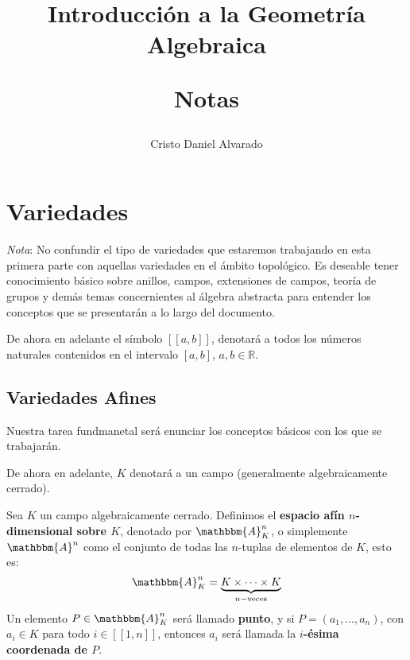 \documentclass[12pt]{report}
\newcounter{it}
\theoremstyle{largebreak}
\newcommand\natint[1]{\ensuremath{\left[\!\left[ #1\right]\!\right]}}
\newcommand{\bbm}[1]{\ensuremath{\mathbbm{#1}}}
\begin{document}
    \setlength{\parskip}{5pt} %
    \setlength{\parindent}{12pt} %
    \title{Introducción a la Geometría Algebraica
    
    Notas}
    \author{Cristo Daniel Alvarado}
    \maketitle

    \tableofcontents %

    
    \chapter{Variedades}
    
    \textit{Nota}: No confundir el tipo de variedades que estaremos trabajando en esta primera parte con aquellas variedades en el ámbito topológico. Es deseable tener conocimiento básico sobre anillos, campos, extensiones de campos, teoría de grupos y demás temas concernientes al álgebra abstracta para entender los conceptos que se presentarán a lo largo del documento.
    
    De ahora en adelante el símbolo $\natint{a,b}$, denotará a todos los números naturales contenidos en el intervalo $[a,b]$, $a,b\in\mathbb{R}$.

    \section{Variedades Afines}
    
    Nuestra tarea fundmanetal será enunciar los conceptos básicos con los que se trabajarán.

    De ahora en adelante, $K$ denotará a un campo (generalmente algebraicamente cerrado).

    \begin{mydef}
        Sea $K$ un campo algebraicamente cerrado. Definimos el \textbf{espacio afín $n$-dimensional sobre $K$}, denotado por $\bbm{A}_K^n$, o simplemente $\bbm{A}^n$ como el conjunto de todas las $n$-tuplas de elementos de $K$, esto es:
        \begin{equation*}
            \bbm{A}_K^n=\underset{n-\textup{veces}}{\underbrace{K\times\cdots\times K}}
        \end{equation*}
        Un elemento $P\in\bbm{A}_K^n$ será llamado \textbf{punto}, y si $P=(a_1,...,a_n)$, con $a_i\in K$ para todo $i\in\natint{1,n}$, entonces $a_i$ será llamada la \textbf{$i$-ésima coordenada de $P$}.
    \end{mydef}
\end{document}
